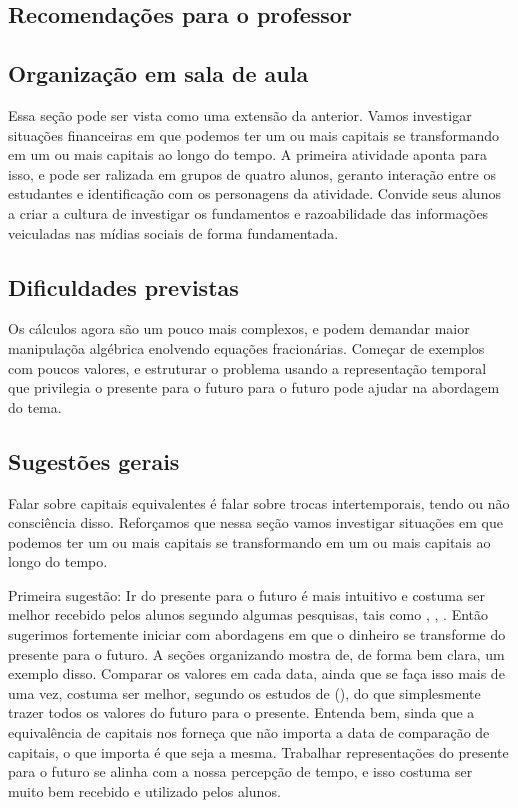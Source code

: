 \begin{paginatexto}
\section*{Recomendações para o professor}

\subsection{Organização em sala de aula} Essa seção pode ser vista como uma extensão da anterior. Vamos investigar situações financeiras em que podemos ter um ou mais capitais se transformando em um ou mais capitais ao longo do tempo. A primeira atividade aponta para isso, e pode ser ralizada em grupos de quatro alunos, geranto interação entre os estudantes e identificação com os personagens da atividade. Convide seus alunos a criar a cultura de investigar os fundamentos e razoabilidade das informações veiculadas nas mídias sociais de forma fundamentada.

\subsection{Dificuldades previstas} Os cálculos agora são um pouco mais complexos, e podem demandar maior manipulaçõa algébrica enolvendo equações fracionárias. Começar de exemplos com poucos valores, e estruturar o problema usando a representação temporal que privilegia o presente para o futuro para o futuro pode ajudar na abordagem do tema.

\subsection{Sugestões gerais}
Falar sobre capitais equivalentes é falar sobre trocas intertemporais, tendo ou não consciência disso. Reforçamos que nessa seção vamos investigar situações em que podemos ter um ou mais capitais se transformando em um ou mais capitais ao longo do tempo.

Primeira sugestão: Ir do presente para o futuro é mais intuitivo e costuma ser melhor recebido pelos alunos segundo algumas pesquisas, tais como \cite{campos2013}, \cite{muniz2016b}, \cite{santana2019}. Então sugerimos fortemente iniciar com abordagens em que o dinheiro se transforme do presente para o futuro. A seções organizando mostra de, de forma bem clara, um exemplo disso. Comparar os valores em cada data, ainda que se faça isso mais de uma vez, costuma ser melhor, segundo os estudos de \citeauthor{muniz2016a} (\citeyear{muniz2016b}), do que simplesmente trazer todos os valores do futuro para o presente. Entenda bem, sinda que a equivalência de capitais nos forneça que não importa a data de comparação de capitais, o que importa é que seja a mesma. Trabalhar representações do presente para o futuro se alinha com a nossa percepção de tempo, e isso costuma ser muito bem recebido e utilizado pelos alunos.


\end{paginatexto}
